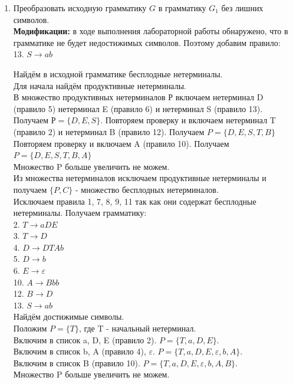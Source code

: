 \documentclass[a4paper,14pt]{extarticle}
\begin{document}
\begin{enumerate}[1.]
    \item Преобразовать исходную грамматику $G$ в
    грамматику $G_1$ без лишних символов.\\
    \textbf{Модификации: }в ходе выполнения лабораторной работы обнаружено, что в грамматике
    не будет недостижимых символов. Поэтому добавим правило:\\
    
    13. $S \rightarrow ab$


    Найдём в исходной грамматике бесплодные нетерминалы.\\
    Для начала найдём продуктивные нетерминалы.\\
    В множество продуктивных нетерминалов Р включаем нетерминал D
(правило 5) нетерминал E (правило 6) и нетерминал S (правило 13). Получаем $Р=\{D,E,S\}$.
Повторяем проверку и включаем нетерминал T (правило 2) и нетерминал B (правило 12). 
Получаем $P=\{D,E,S,T,B\}$\\
Повторяем проверку и включаем A (правило 10). Получаем $P=\{D,E,S,T,B,A\}$\\
Множество P больше увеличить не можем.\\

Из множества нетерминалов исключаем продуктивные 
нетерминалы и получаем $\{P,C\}$ - множество бесплодных нетерминалов.\\

Исключаем правила 1, 7, 8, 9, 11 так как они содержат 
бесплодные нетерминалы. Получаем грамматику:\\

2. $T \rightarrow aDE$\\
3. $T \rightarrow D$\\
4. $D \rightarrow DTAb$\\
5. $D \rightarrow b$\\
6. $E \rightarrow \varepsilon$\\
10. $A \rightarrow Bbb$\\
12. $B \rightarrow D$\\
13. $S \rightarrow ab$\\

Найдём достижимые символы.\\
Положим $P = \{T\}$, где T - начальный нетерминал.\\
Включим в список a, D, E (правило 2). $P = \{T, a, D, E\}$.\\
Включим в список b, A (правило 4), $\varepsilon$. $P = \{T, a, D, E, \varepsilon, b, A\}$.\\
Включим в список B (правило 10). $P = \{T, a, D, E, \varepsilon, b, A, B\}$.\\
Множество P больше увеличить не можем.\\


\end{enumerate}
\end{document}

